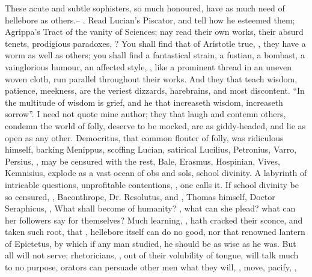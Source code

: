 These acute and subtle sophisters, so much honoured, have
as much need of hellebore as others.-- . Read Lucian's Piscator, and
tell how he esteemed them; Agrippa's Tract of the vanity of Sciences; nay read
their own works, their absurd tenets, prodigious paradoxes, ? You shall find that of Aristotle true, , they have a worm as well as others; you shall
find a fantastical strain, a fustian, a bombast, a vainglorious humour, an
affected style, \etc{}, like a prominent thread in an uneven woven cloth, run
parallel throughout their works. And they that teach wisdom, patience,
meekness, are the veriest dizzards, harebrains, and most discontent.
\enquote{In the multitude of wisdom is grief, and he that
increaseth wisdom, increaseth sorrow}. I need not quote mine author; they that
laugh and contemn others, condemn the world of folly, deserve to be mocked, are
as giddy-headed, and lie as open as any other. Democritus,
that common flouter of folly, was ridiculous himself, barking Menippus,
scoffing Lucian, satirical Lucilius, Petronius, Varro, Persius, \etc{}, may be
censured with the rest,  Bale,
Erasmus, Hospinian, Vives, Kemnisius, explode as a vast ocean of obs and sols,
school divinity. A labyrinth of intricable questions,
unprofitable contentions, , one calls it. If
school divinity be so censured, , \etc{} Baconthrope, Dr. Resolutus, and ,
Thomas himself, Doctor Seraphicus, , \etc{} What shall become of humanity? , what can she
plead? what can her followers say for themselves? Much learning,
, hath cracked their sconce, and
taken such root, that , hellebore itself
can do no good, nor that renowned lantern of Epictetus, by
which if any man studied, he should be as wise as he was. But all will not
serve; rhetoricians, , out of
their volubility of tongue, will talk much to no purpose, orators can persuade
other men what they will, , move, pacify, \etc{},
